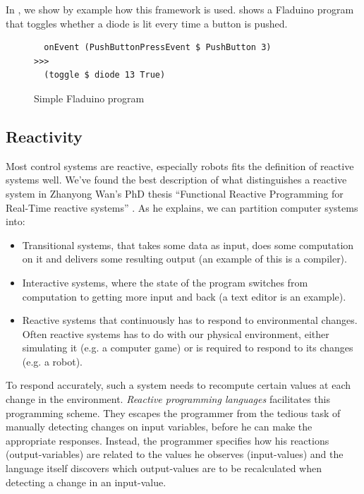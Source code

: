 \documentclass[a4paper, oneside, final]{memoir}
\let\fref\undefined
\let\Fref\undefined
\begin{document}
In \fref{sec:pushbuttondef}, we show by example how this framework is
used. \Fref{fig:fladuino-simple} shows a Fladuino program that toggles
whether a diode is lit every time a button is pushed.

\begin{figure}
  \centering

\begin{verbatim}
  onEvent (PushButtonPressEvent $ PushButton 3) 
>>> 
  (toggle $ diode 13 True)
\end{verbatim}  

  \caption{Simple Fladuino program}
  \label{fig:fladuino-simple}
\end{figure}

\subsection{Reactivity}
Most control systems are reactive, especially robots fits the
definition of reactive systems well. We've found the best description
of what distinguishes a reactive system in Zhanyong Wan's PhD thesis
``Functional Reactive Programming for Real-Time reactive systems''
\cite{Chambers1992}.  As he explains, we can partition computer systems
into:
\begin{itemize}
\item Transitional systems, that takes some data as input, does some
  computation on it and delivers some resulting output (an example of this
  is a compiler).
\item Interactive systems, where the state of the program switches
  from computation to getting more input and back (a text editor is an
  example).
\item Reactive systems that continuously has to respond to
  environmental changes. Often reactive systems has to do with our
  physical environment, either simulating it (e.g. a computer game) or
  is required to respond to its changes (e.g. a robot).
\end{itemize}

To respond accurately, such a system needs to recompute certain values
at each change in the environment. \textit{Reactive programming
  languages} facilitates this programming scheme. They escapes the
programmer from the tedious task of manually detecting changes on
input variables, before he can make the appropriate
responses. Instead, the programmer specifies how his reactions
(output-variables) are related to the values he observes
(input-values) and the language itself discovers which output-values
are to be recalculated when detecting a change in an input-value.
\end{document}
